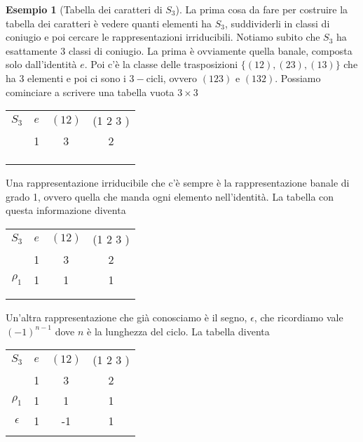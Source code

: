 \documentclass[11pt]{article}
\theoremstyle{plain}
\theoremstyle{definition}
\newtheorem{exmp}{Esempio}[section]
\theoremstyle{remark}
\begin{document}
\begin{exmp}[Tabella dei caratteri di $S_3$]
La prima cosa da fare per costruire la tabella dei caratteri è vedere quanti elementi ha $S_3$,
suddividerli in classi di coniugio e poi cercare le rappresentazioni irriducibili.
Notiamo subito che $S_3$ ha esattamente 3 classi di coniugio. La prima è ovviamente quella banale, composta solo dall'identità $e$.
Poi c'è la classe delle trasposizioni $\{(1 2) ,(2 3), (1 3)\}$ che ha 3 elementi e poi ci sono i $3-$cicli, ovvero $(1 2 3)$ e $(1 3 2)$.
Possiamo cominciare a scrivere una tabella vuota $3\times 3$


\begin{table}[!ht]
\centering
\begin{tabular}{|c|c|c|c|}
\hline
$S_3$  & $e$ & $(1 2)$ & (1 2 3 )  \\
 & 1 & 3 & 2 \\
\hline
 & &  & \\
\hline
& &  & \\
\hline
& &  & \\
\hline
\end{tabular}
\end{table}

Una rappresentazione irriducibile che c'è sempre è la rappresentazione banale di grado 1, ovvero quella che manda ogni elemento nell'identità. La tabella con questa informazione diventa

\begin{table}[!ht]
\centering
\begin{tabular}{|c|c|c|c|}
\hline
$S_3$  & $e$ & $(1 2)$ & (1 2 3 )    \\
 & 1 & 3 & 2 \\
\hline
 $\rho_1$ & 1 & 1  & 1 \\
\hline
& &  & \\
\hline
& &  & \\
\hline
\end{tabular}
\end{table}

Un'altra rappresentazione che già conosciamo è il segno, $\epsilon$, che ricordiamo vale $(-1)^{n-1}$ dove $n$ è la lunghezza del ciclo. La tabella diventa

\begin{table}[!ht]
\centering
\begin{tabular}{|c|c|c|c|}
\hline
$S_3$  & $e$ & $(1 2)$ & (1 2 3 )    \\
 & 1 & 3 & 2 \\
\hline
 $\rho_1$ & 1 & 1  & 1 \\
\hline
$\epsilon$ & 1 & -1 & 1 \\
\hline
& &  & \\
\hline
\end{tabular}
\end{table}


\end{exmp}
\end{document}
